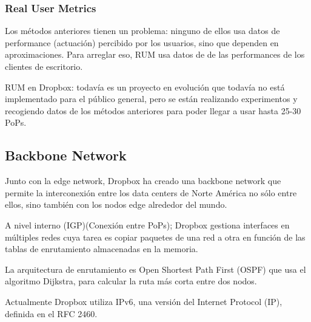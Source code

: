 \subsubsection{Real User Metrics}
Los métodos anteriores tienen un problema: ninguno de ellos usa datos de performance (actuación) percibido por los usuarios, sino que dependen en aproximaciones. Para arreglar eso, RUM usa datos de de las performances de los clientes de escritorio.

RUM en Dropbox: todavía es un proyecto en evolución que todavía no está implementado para el público general, pero se están realizando experimentos y recogiendo datos de los métodos anteriores para poder llegar a usar hasta 25-30 PoPs.

\subsection{Backbone Network}
Junto con la edge network, Dropbox ha creado una backbone network que permite la interconexión entre los data centers de Norte América no sólo entre ellos, sino también con los nodos edge alrededor del mundo.

A nivel interno (IGP)(Conexión entre PoPs); 
Dropbox gestiona interfaces en múltiples redes cuya tarea es copiar paquetes de una red a otra en función de las tablas de enrutamiento almacenadas en la memoria.

La arquitectura de enrutamiento es  Open Shortest Path First (OSPF) que usa el algoritmo Dijkstra, para calcular la ruta más corta entre dos nodos.

Actualmente Dropbox utiliza IPv6, una versión del Internet Protocol (IP), definida en el RFC 2460.

